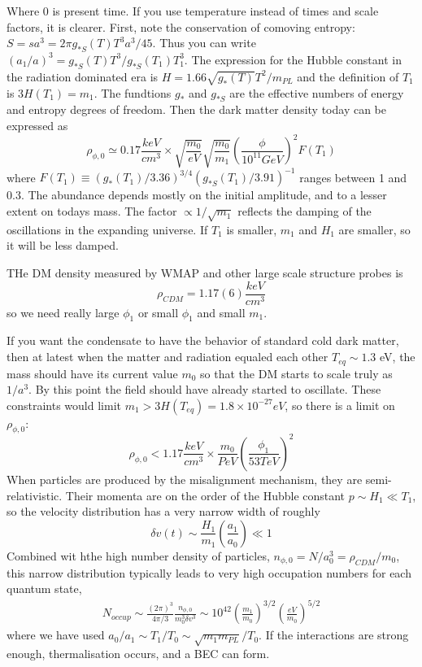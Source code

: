 \documentclass[12pt, twoside]{book}
\begin{document}
Where 0 is present time.
If you use temperature instead of times and scale factors, it is clearer. First, note the conservation of comoving entropy: $S = sa^3 = 2\pi g_{*S}(T)T^3a^3/45$. Thus you can write $(a_1/a)^3 = g_{*S}(T)T^3/g_{*S}(T_1)T_1^3$. The expression for the Hubble constant in the radiation dominated era is $H=1.66\sqrt{g_{*}(T)}T^2/m_{PL}$ and the definition of $T_1$ is $3H(T_1) = m_1$. The fundtions $g_*$ and $g_{*S}$ are the effective numbers of energy and entropy degrees of freedom. Then the dark matter density today can be expressed as
\[
\rho_{\phi,0} \simeq 0.17 \frac{keV}{cm^3} \times \sqrt{\frac{m_0}{eV}}\sqrt{\frac{m_0}{m_1}}(\frac{\phi}{10^11 GeV})^2 F(T_1)
\]
where $F(T_1) \equiv (g_*(T_1)/3.36)^{3/4}(g_{*S}(T_1)/3.91)^{-1}$ ranges between 1 and 0.3. The abundance depends mostly on the initial amplitude, and to a lesser extent on todays mass. The factor $\propto 1/\sqrt{m_1}$ reflects the damping of the oscillations in the expanding universe. If $T_1$ is smaller, $m_1$ and $H_1$ are smaller, so it will be less damped.

THe DM density measured by WMAP and other large scale structure probes is
\[
\rho_{CDM} = 1.17(6)\frac{keV}{cm^3}
\]
so we need really large $\phi_1$ or small $\phi_1$ and small $m_1$.

If you want the condensate to have the behavior of standard cold dark matter, then at latest when the matter and radiation equaled each other $T_{eq} \sim 1.3$ eV, the mass should have its current value $m_0$ so that the DM starts to scale truly as $1/a^3$. By this point the field should have already started to oscillate. These constraints would limit $m_1 > 3H(T_{eq}) = 1.8 \times 10^{-27} eV$, so there is a limit on $\rho_{\phi,0}$:
\[
\rho_{\phi,0} < 1.17 \frac{keV}{cm^3} \times \frac{m_0}{PeV} (\frac{\phi_1}{53 TeV})^2
\]
When particles are produced by the misalignment mechanism, they are semi-relativistic. Their momenta are on the order of the Hubble constant $p \sim H_1 \ll T_1$, so the velocity distribution has a very narrow width of roughly
\[
\delta v(t) \sim \frac{H_1}{m_1} (\frac{a_1}{a_0}) \ll 1
\]
Combined wit hthe high number density of particles, $n_{\phi,0} = N/a_0^3 = \rho_{CDM}/m_0$, this narrow distribution typically leads to very high occupation numbers for each quantum state,
\begin{multline}
N_{occup} \sim \frac{(2\pi)^3}{4\pi/3}\frac{n_{\phi,0}}{m_{0}^3\delta v^3} \sim 10^{42} (\frac{m_1}{m_0})^{3/2}(\frac{eV}{m_0})^{5/2}
\end{multline}
where we have used $a_0/a_1 \sim T_1/T_0 \sim \sqrt{m_1 m_{PL}}/T_0$. If the interactions are strong enough, thermalisation occurs, and a BEC can form.
\end{document}
